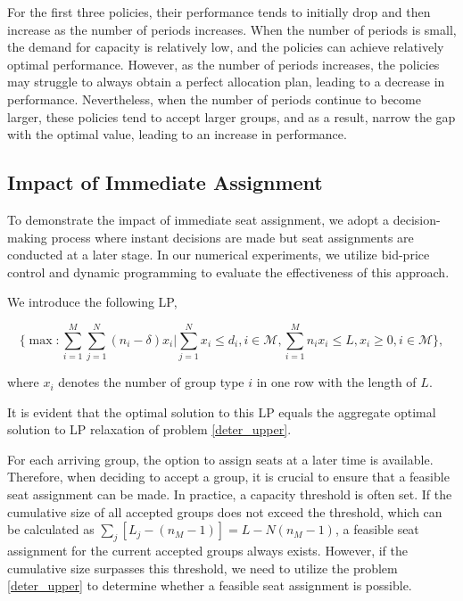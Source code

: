 For the first three policies, their performance tends to initially drop and then increase as the number of periods increases. When the number of periods is small, the demand for capacity is relatively low, and the policies can achieve relatively optimal performance. However, as the number of periods increases, the policies may struggle to always obtain a perfect allocation plan, leading to a decrease in performance. Nevertheless, when the number of periods continue to become larger, these policies tend to accept larger groups, and as a result, narrow the gap with the optimal value, leading to an increase in performance.


\subsection{Impact of Immediate Assignment}
To demonstrate the impact of immediate seat assignment, we adopt a decision-making process where instant decisions are made but seat assignments are conducted at a later stage. In our numerical experiments, we utilize bid-price control and dynamic programming to evaluate the effectiveness of this approach.

We introduce the following LP,

\begin{equation}\label{test}
  \{\max: \sum_{i=1}^{M} \sum_{j= 1}^{N} (n_i- \delta) x_{i} \big| \sum_{j= 1}^{N} x_{i} \leq d_{i}, i \in \mathcal{M}, \sum_{i=1}^{M} n_{i} x_{i} \leq L, x_{i} \geq 0, i \in \mathcal{M}\},
\end{equation}

where $x_{i}$ denotes the number of group type $i$ in one row with the length of $L$.

It is evident that the optimal solution to this LP equals the aggregate optimal solution to LP relaxation of problem \eqref{deter_upper}.

For each arriving group, the option to assign seats at a later time is available. Therefore, when deciding to accept a group, it is crucial to ensure that a feasible seat assignment can be made. In practice, a capacity threshold is often set. If the cumulative size of all accepted groups does not exceed the threshold, which can be calculated as $\sum_{j} [L_j- (n_M - 1)]= L - N(n_M -1)$, a feasible seat assignment for the current accepted groups always exists. However, if the cumulative size surpasses this threshold, we need to utilize the problem \ref{deter_upper} to determine whether a feasible seat assignment is possible.

